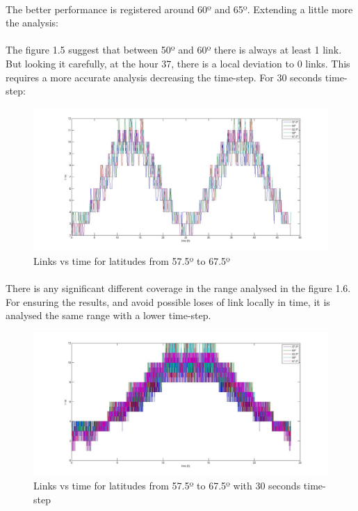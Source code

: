 \documentclass[12pt,a4paper]{report}
\begin{document}
\paragraph{}
The better performance is registered around 60º and 65º. Extending a little more the analysis:

\paragraph{}
The figure 1.5 suggest that between 50º and 60º there is always at least 1 link. But looking it carefully, at the hour 37, there is a local deviation to 0 links. This requires a more accurate analysis decreasing the time-step. For 30 seconds time-step:

\begin{figure}[H]
\begin{center}
\includegraphics[scale=0.30]{575_25_675_lat.jpg}
\caption{Links vs time for latitudes from 57.5º to 67.5º}
\end{center}
\end{figure}

\paragraph{}
There is any significant different coverage in the range analysed in the figure 1.6. For ensuring the results, and avoid possible loses of link locally in time, it is analysed the same range with a lower time-step.


\begin{figure}[H]
\begin{center}
\includegraphics[scale=0.30]{575_25_675_(30s)_lat.jpg}
\caption{Links vs time for latitudes from 57.5º to 67.5º with 30 seconds time-step}
\end{center}
\end{figure}
\end{document}
